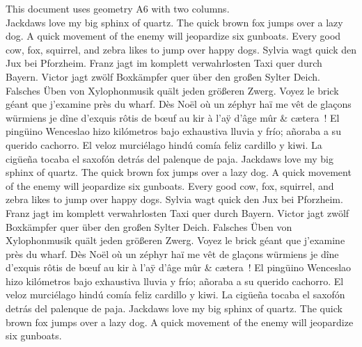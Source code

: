 \documentclass[8pt]{extarticle}
\begin{document}
\setlength{\emergencystretch}{1em}
This document uses geometry A6 with two columns.
\\
Jackdaws love my big sphinx of quartz.
The quick brown fox jumps over a lazy dog.
A quick movement of the enemy will jeopardize six gunboats.
Every good cow, fox, squirrel, and zebra likes to jump over happy dogs.
Sylvia wagt quick den Jux bei Pforzheim.
Franz jagt im komplett verwahrlosten Taxi quer durch Bayern.
Victor jagt zwölf Boxkämpfer quer über den großen Sylter Deich.
Falsches Üben von Xylophonmusik quält jeden größeren Zwerg.
Voyez le brick géant que j'examine près du wharf.
Dès Noël où un zéphyr haï me vêt de glaçons würmiens je dîne d’exquis rôtis de bœuf au kir à l’aÿ d’âge mûr \& cætera~!
El pingüino Wenceslao hizo kilómetros bajo exhaustiva lluvia y frío; añoraba a su querido cachorro.
El veloz murciélago hindú comía feliz cardillo y kiwi. La cigüeña tocaba el saxofón detrás del palenque de paja.
%
Jackdaws love my big sphinx of quartz.
The quick brown fox jumps over a lazy dog.
A quick movement of the enemy will jeopardize six gunboats.
Every good cow, fox, squirrel, and zebra likes to jump over happy dogs.
Sylvia wagt quick den Jux bei Pforzheim.
Franz jagt im komplett verwahrlosten Taxi quer durch Bayern.
Victor jagt zwölf Boxkämpfer quer über den großen Sylter Deich.
Falsches Üben von Xylophonmusik quält jeden größeren Zwerg.
Voyez le brick géant que j'examine près du wharf.
Dès Noël où un zéphyr haï me vêt de glaçons würmiens je dîne d’exquis rôtis de bœuf au kir à l’aÿ d’âge mûr \& cætera~!
El pingüino Wenceslao hizo kilómetros bajo exhaustiva lluvia y frío; añoraba a su querido cachorro.
El veloz murciélago hindú comía feliz cardillo y kiwi. La cigüeña tocaba el saxofón detrás del palenque de paja.
%
Jackdaws love my big sphinx of quartz.
The quick brown fox jumps over a lazy dog.
A quick movement of the enemy will jeopardize six gunboats.
\end{document}
